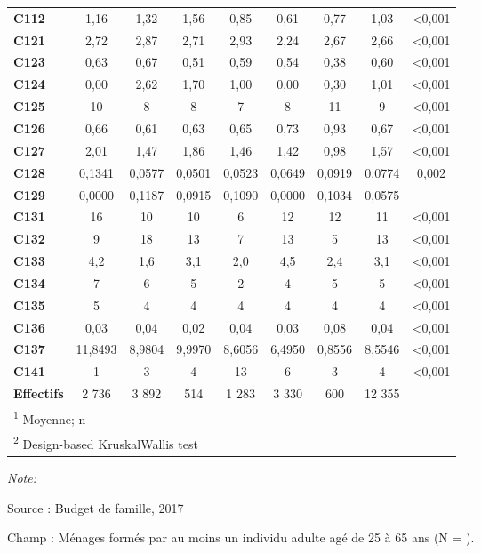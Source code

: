 \documentclass[
  12pt,
]{book}
\begin{document}
\begin{table}[!h]
{\begin{threeparttable}
\begin{tabular}[t]{lcccccccc}
\textbf{C112} & 1,16 & 1,32 & 1,56 & 0,85 & 0,61 & 0,77 & 1,03 & <0,001\\
\addlinespace
\textbf{C121} & 2,72 & 2,87 & 2,71 & 2,93 & 2,24 & 2,67 & 2,66 & <0,001\\
\textbf{C123} & 0,63 & 0,67 & 0,51 & 0,59 & 0,54 & 0,38 & 0,60 & <0,001\\
\textbf{C124} & 0,00 & 2,62 & 1,70 & 1,00 & 0,00 & 0,30 & 1,01 & <0,001\\
\textbf{C125} & 10 & 8 & 8 & 7 & 8 & 11 & 9 & <0,001\\
\textbf{C126} & 0,66 & 0,61 & 0,63 & 0,65 & 0,73 & 0,93 & 0,67 & <0,001\\
\addlinespace
\textbf{C127} & 2,01 & 1,47 & 1,86 & 1,46 & 1,42 & 0,98 & 1,57 & <0,001\\
\textbf{C128} & 0,1341 & 0,0577 & 0,0501 & 0,0523 & 0,0649 & 0,0919 & 0,0774 & 0,002\\
\textbf{C129} & 0,0000 & 0,1187 & 0,0915 & 0,1090 & 0,0000 & 0,1034 & 0,0575 & \\
\textbf{C131} & 16 & 10 & 10 & 6 & 12 & 12 & 11 & <0,001\\
\textbf{C132} & 9 & 18 & 13 & 7 & 13 & 5 & 13 & <0,001\\
\addlinespace
\textbf{C133} & 4,2 & 1,6 & 3,1 & 2,0 & 4,5 & 2,4 & 3,1 & <0,001\\
\textbf{C134} & 7 & 6 & 5 & 2 & 4 & 5 & 5 & <0,001\\
\textbf{C135} & 5 & 4 & 4 & 4 & 4 & 4 & 4 & <0,001\\
\textbf{C136} & 0,03 & 0,04 & 0,02 & 0,04 & 0,03 & 0,08 & 0,04 & <0,001\\
\textbf{C137} & 11,8493 & 8,9804 & 9,9970 & 8,6056 & 6,4950 & 0,8556 & 8,5546 & <0,001\\
\addlinespace
\textbf{C141} & 1 & 3 & 4 & 13 & 6 & 3 & 4 & <0,001\\
\textbf{Effectifs} & 2 736 & 3 892 & 514 & 1 283 & 3 330 & 600 & 12 355 & \\
\bottomrule
\multicolumn{9}{l}{\rule{0pt}{1em}\textsuperscript{1} Moyenne; n}\\
\multicolumn{9}{l}{\rule{0pt}{1em}\textsuperscript{2} Design-based KruskalWallis test}\\
\end{tabular}
\begin{tablenotes}
\item \textit{Note: } 
\item Source : Budget de famille, 2017
\item Champ : Ménages formés par au moins un individu adulte agé de 25 à 65 ans (N = ).
\end{tablenotes}
\end{threeparttable}}
\end{table}
\end{document}
